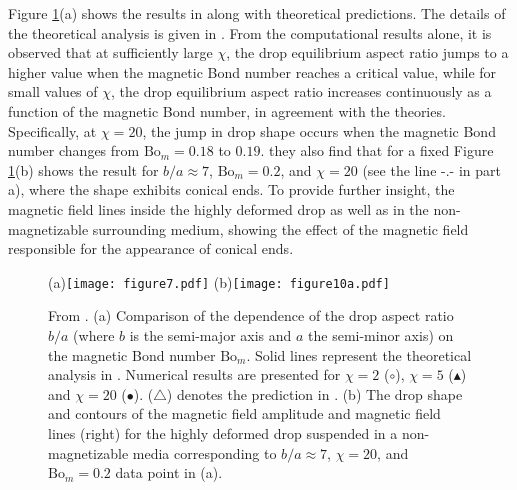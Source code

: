 Figure \ref{fig:figure7}(a) shows the results in \cite{ATRRWPR} along with theoretical predictions.
The details of the theoretical analysis is given in \cite{ATRRWPR}. 
 From the computational results alone, it is observed that at sufficiently large 
 $\chi$, the drop equilibrium aspect ratio jumps to a higher value when the 
 magnetic Bond number reaches a critical value, while 
for small values of $\chi$, the drop equilibrium aspect ratio increases continuously as a function of the magnetic Bond number, in agreement with the theories. Specifically, at $\chi=20$, the jump in drop shape  occurs 
 when the magnetic Bond number changes from $\mbox{Bo}_{m} = 0.18$ to $0.19$.
they also find that for a fixed 
Figure \ref{fig:figure7}(b) shows the result for $b/a \approx 7$, $\mbox{Bo}_{m} = 0.2$, and $\chi = 20$
(see the line -.- in part a), where the shape exhibits 
conical ends. To provide further insight, 
the magnetic field lines inside the highly deformed drop as well as in the 
non-magnetizable surrounding medium, showing the effect of the magnetic field responsible
for the appearance of conical ends. 
\begin{figure}
\begin{center}
(a)\texttt{[image: figure7.pdf]}
(b)\texttt{[image: figure10a.pdf]}
\caption{From \cite{ATRRWPR}. (a) Comparison of the dependence of the drop aspect ratio $b/a$
(where $b$ is the semi-major axis and $a$ the
semi-minor axis) on the magnetic Bond number $\mbox{Bo}_{m}$.
Solid lines represent the theoretical analysis in \cite{ATRRWPR}. Numerical 
results are presented for $\chi = 2$ ({\large $\circ$}), $\chi = 5$ ($\blacktriangle$) and $\chi = 20$ ({\large $\bullet$}). 
(\small $\triangle$) denotes the prediction in \cite{Bacri}.
(b) The drop shape and contours of the magnetic field amplitude and magnetic field lines (right)
for the highly deformed drop suspended in a non-magnetizable media corresponding to $b/a\approx7$,
$\chi = 20$, and $\mbox{Bo}_{m} = 0.2$ data point in (a).}
\label{fig:figure7}
\end{center}
\end{figure}   

